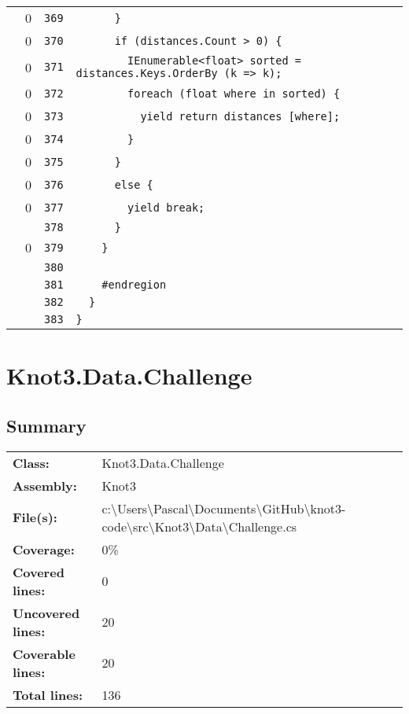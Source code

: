 \documentclass[a4paper,10pt]{article}
\begin{document}
\begin{longtable}[l]{lrrl}
\cellcolor{red} & 0 & \verb~369~ & \verb~      }~\\
\cellcolor{red} & 0 & \verb~370~ & \verb~      if (distances.Count > 0) {~\\
\cellcolor{red} & 0 & \verb~371~ & \verb~        IEnumerable<float> sorted = distances.Keys.OrderBy (k => k);~\\
\cellcolor{red} & 0 & \verb~372~ & \verb~        foreach (float where in sorted) {~\\
\cellcolor{red} & 0 & \verb~373~ & \verb~          yield return distances [where];~\\
\cellcolor{red} & 0 & \verb~374~ & \verb~        }~\\
\cellcolor{red} & 0 & \verb~375~ & \verb~      }~\\
\cellcolor{red} & 0 & \verb~376~ & \verb~      else {~\\
\cellcolor{red} & 0 & \verb~377~ & \verb~        yield break;~\\
\cellcolor{gray} &  & \verb~378~ & \verb~      }~\\
\cellcolor{red} & 0 & \verb~379~ & \verb~    }~\\
\cellcolor{gray} &  & \verb~380~ & \verb~~\\
\cellcolor{gray} &  & \verb~381~ & \verb~    #endregion~\\
\cellcolor{gray} &  & \verb~382~ & \verb~  }~\\
\cellcolor{gray} &  & \verb~383~ & \verb~}~\\
\end{longtable}
\newpage
\section{Knot3.Data.Challenge}
\subsection{Summary}
\begin{longtable}[l]{ll}
\textbf{Class:} & Knot3.Data.Challenge\\
\textbf{Assembly:} & Knot3\\
\textbf{File(s):} & \begin{minipage}[t]{12cm}{c:\textbackslash Users\textbackslash Pascal\textbackslash Documents\textbackslash GitHub\textbackslash knot3-code\textbackslash src\textbackslash Knot3\textbackslash Data\textbackslash Challenge.cs}\end{minipage} \\
\textbf{Coverage:} & 0\%\\
\textbf{Covered lines:} & 0\\
\textbf{Uncovered lines:} & 20\\
\textbf{Coverable lines:} & 20\\
\textbf{Total lines:} & 136\\
\end{longtable}
\end{document}
